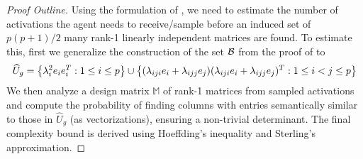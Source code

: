     \begin{proof}[Proof Outline]Using the formulation of , we need to estimate the number of activations the agent needs to receive/sample before an induced set of $p(p+1)/2$ many rank-1 linearly independent matrices are found.
    To estimate this, first we generalize the construction of the set ${{\mathcal{B}}}$ from the proof of  to 
    \begin{align*}
         \widehat{U}_g = \left\{\lambda_i^2 e_ie_i^T: 1 \leq i \leq p\right\} \cup  \left\{(\lambda_{iji} e_i + \lambda_{ijj}e_j)(\lambda_{iji} e_i + \lambda_{ijj}e_j)^T: 1 \leq i < j \leq p\right\}
    \end{align*}
    We then analyze a design matrix $\mathbb{M}$ of rank-1 matrices from sampled activations and compute the probability of finding columns with entries semantically similar to those in $\widehat{U}_g$ (as vectorizations), ensuring a non-trivial determinant. The final complexity bound is derived using Hoeffding's inequality and Sterling's approximation.
    \end{proof}



